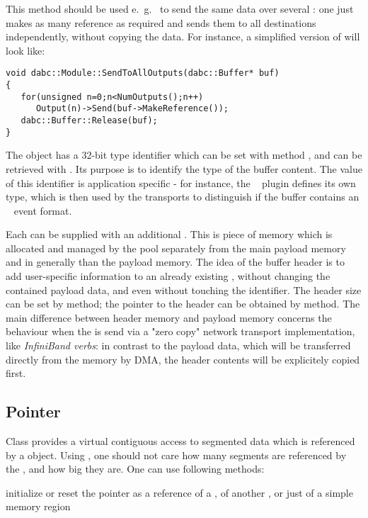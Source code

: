 This method should be used e.~g.~ to send
the same data over several : 
one just makes as many reference   
as required and sends them to all destinations independently,
without copying the data.
For instance, a simplified version of 
 will look like:  

\begin{small}
\begin{verbatim}     
void dabc::Module::SendToAllOutputs(dabc::Buffer* buf)
{
   for(unsigned n=0;n<NumOutputs();n++)
      Output(n)->Send(buf->MakeReference());
   dabc::Buffer::Release(buf);
}
\end{verbatim}     
\end{small}


The  object has a 32-bit type identifier which can be set with
method , and can be retrieved with .
Its purpose is to identify the type of the buffer content. The value of   
this identifier is application specific - for instance, 
the \mbs~ plugin defines its own type,
which is then used by the transports to distinguish if the buffer 
contains an \mbs~ event format.  

Each  can be supplied with an additional . 
This is piece of 
memory which is allocated and managed by the pool separately from the main  
payload memory and in generally  than the payload memory. 
The idea of the buffer header is to add user-specific
information to an already existing ,
without changing the contained payload data, and
even without touching the  identifier. 
The header size can be set by  method;
the pointer to the header can be
obtained by  method.
The main difference between header memory and payload memory 
concerns the behaviour when the  is send via 
a "zero copy" network transport implementation, like {\em InfiniBand verbs}:
in contrast to the payload data, which will be
transferred directly from the  memory by DMA, 
the header contents will be explicitely copied first.


\subsection{Pointer}
\label{prog_services_memory_pointer}
Class  provides a virtual contiguous access to 
segmented data which is referenced by a  object.
Using , one should not care how many segments are 
referenced by the , and how big they are. One can use following methods:
\bbul
\item[\func{Pointer()} or \func{reset()}]  initialize or reset the pointer as a reference of a , of another , or just of a simple memory region   

